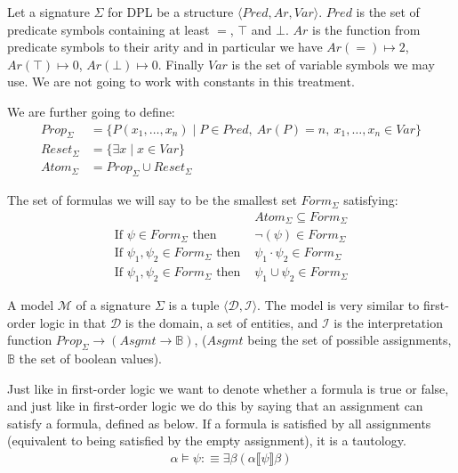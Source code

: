 \documentclass[12pt]{article}
\begin{document}
Let a signature $\Sigma$ for DPL be a structure $\langle Pred, Ar, Var\rangle$. $Pred$ is the set of predicate symbols containing at least $=$, $\top$ and $\bot$. $Ar$ is the function from predicate symbols to their arity and in particular we have $Ar(=) \mapsto 2$, $Ar(\top) \mapsto 0$, $Ar(\bot) \mapsto 0$. Finally $Var$ is the set of variable symbols we may use. We are not going to work with constants in this treatment.

We are further going to define:
%
\begin{align}
Prop_\Sigma &= \{P(x_1,\dots,x_n) \mid P \in Pred,\ Ar(P)=n,\ x_1,\dots,x_n\in Var\}\\
Reset_\Sigma &= \{\exists x \mid x\in Var\}\\
Atom_\Sigma &= Prop_\Sigma \cup Reset_\Sigma
\end{align}

The set of formulas we will say to be the smallest set $Form_\Sigma$ satisfying:
\begin{align}
&Atom_\Sigma \subseteq Form_\Sigma\\
\text{If } \psi\in Form_\Sigma \text{ then } &\neg(\psi)\in Form_\Sigma\\
\text{If } \psi_1,\psi_2\in Form_\Sigma \text{ then } &\psi_1\cdot\psi_2\in Form_\Sigma\\
\text{If } \psi_1,\psi_2\in Form_\Sigma \text{ then } &\psi_1\cup\psi_2\in Form_\Sigma
\end{align}

A model $\mathcal{M}$ of a signature $\Sigma$ is a tuple $\langle\mathcal{D},\mathcal{I}\rangle$. The model is very similar to first-order logic in that $\mathcal{D}$ is the domain, a set of entities, and $\mathcal{I}$ is the interpretation function $Prop_\Sigma\to(Asgmt\to\mathbb{B})$, ($Asgmt$ being the set of possible assignments, $\mathbb{B}$ the set of boolean values).

Just like in first-order logic we want to denote whether a formula is true or false, and just like in first-order logic we do this by saying that an assignment can satisfy a formula, defined as below. If a formula is satisfied by all assignments (equivalent to being satisfied by the empty assignment), it is a tautology.
\begin{align}
\alpha\models\psi :\equiv \exists\beta(\alpha\llbracket\psi\rrbracket\beta)
\end{align}
\end{document}
